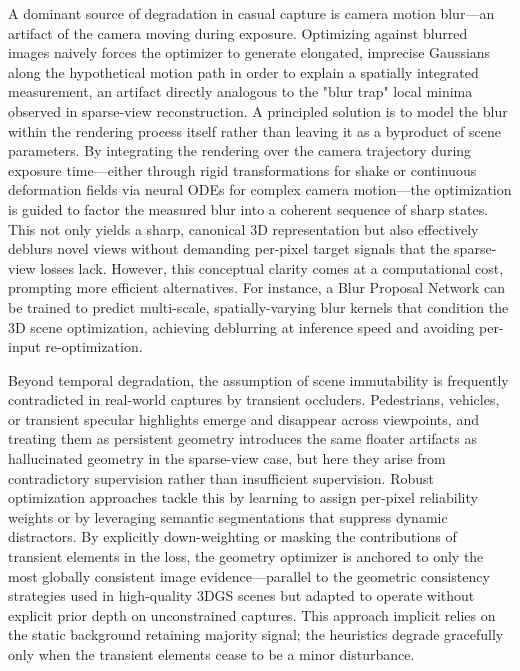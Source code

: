 \documentclass[11pt,a4paper]{article}
\begin{document}
A dominant source of degradation in casual capture is camera motion blur---an artifact of the camera moving during exposure. Optimizing against blurred images naively forces the optimizer to generate elongated, imprecise Gaussians along the hypothetical motion path in order to explain a spatially integrated measurement, an artifact directly analogous to the "blur trap" local minima observed in sparse-view reconstruction. A principled solution is to model the blur within the rendering process itself rather than leaving it as a byproduct of scene parameters. By integrating the rendering over the camera trajectory during exposure time---either through rigid transformations for shake or continuous deformation fields via neural ODEs for complex camera motion---the optimization is guided to factor the measured blur into a coherent sequence of sharp states. This not only yields a sharp, canonical 3D representation but also effectively deblurs novel views without demanding per-pixel target signals that the sparse-view losses lack. However, this conceptual clarity comes at a computational cost, prompting more efficient alternatives. For instance, a Blur Proposal Network can be trained to predict multi-scale, spatially-varying blur kernels that condition the 3D scene optimization, achieving deblurring at inference speed and avoiding per-input re-optimization.

Beyond temporal degradation, the assumption of scene immutability is frequently contradicted in real-world captures by transient occluders. Pedestrians, vehicles, or transient specular highlights emerge and disappear across viewpoints, and treating them as persistent geometry introduces the same floater artifacts as hallucinated geometry in the sparse-view case, but here they arise from contradictory supervision rather than insufficient supervision. Robust optimization approaches tackle this by learning to assign per-pixel reliability weights or by leveraging semantic segmentations that suppress dynamic distractors. By explicitly down-weighting or masking the contributions of transient elements in the loss, the geometry optimizer is anchored to only the most globally consistent image evidence---parallel to the geometric consistency strategies used in high-quality 3DGS scenes but adapted to operate without explicit prior depth on unconstrained captures. This approach implicit relies on the static background retaining majority signal; the heuristics degrade gracefully only when the transient elements cease to be a minor disturbance.
\end{document}

